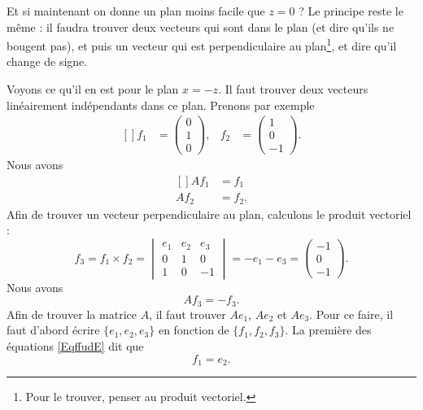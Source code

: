 Et si maintenant on donne un plan moins facile que \( z=0\) ? Le principe reste le même : il faudra trouver deux vecteurs qui sont dans le plan (et dire qu'ils ne bougent pas), et puis un vecteur qui est perpendiculaire au plan\footnote{Pour le trouver, penser au produit vectoriel.}, et dire qu'il change de signe.

Voyons ce qu'il en est pour le plan \( x=-z\). Il faut trouver deux vecteurs linéairement indépendants dans ce plan. Prenons par exemple
\begin{equation}		\label{EqffudE}
	\begin{aligned}[]
		f_1 & =\begin{pmatrix}
			0 \\
			1 \\
			0
		\end{pmatrix}, & f_2 & =\begin{pmatrix}
			1 \\
			0 \\
			-1
		\end{pmatrix}.
	\end{aligned}
\end{equation}
Nous avons
\begin{equation}
	\begin{aligned}[]
		Af_1 & =f_1  \\
		Af_2 & =f_2.
	\end{aligned}
\end{equation}
Afin de trouver un vecteur perpendiculaire au plan, calculons le produit vectoriel :
\begin{equation}
	f_3=f_1\times f_2=\begin{vmatrix}
		e_1 & e_2 & e_3 \\
		0   & 1   & 0   \\
		1   & 0   & -1
	\end{vmatrix}=-e_1-e_3=\begin{pmatrix}
		-1 \\
		0  \\
		-1
	\end{pmatrix}.
\end{equation}
Nous avons
\begin{equation}
	Af_3=-f_3.
\end{equation}
Afin de trouver la matrice \( A\), il faut trouver \( Ae_1\), \( Ae_2\) et \( Ae_3\). Pour ce faire, il faut d'abord écrire \( \{ e_1,e_2,e_3 \}\) en fonction de \( \{ f_1,f_2,f_3 \}\). La première des équations \eqref{EqffudE} dit que
\begin{equation}
	f_1=e_2.
\end{equation}
